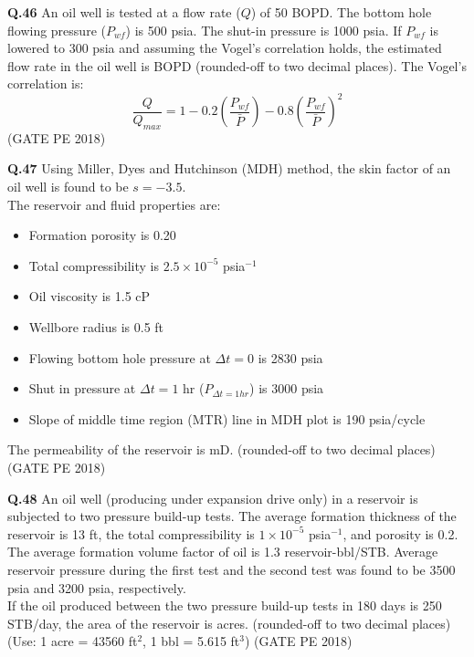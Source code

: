 \documentclass[15pt,a4paper]{article}
\begin{document}
\vspace{1cm}

\noindent\textbf{Q.46} An oil well is tested at a flow rate ($Q$) of 50 BOPD. The bottom hole flowing pressure ($P_{wf}$) is 500 psia. The shut-in pressure is 1000 psia. If $P_{wf}$ is lowered to 300 psia and assuming the Vogel's correlation holds, the estimated flow rate in the oil well is \underline{\hspace{2cm}} BOPD (rounded-off to two decimal places). The Vogel's correlation is:
\[ \frac{Q}{Q_{max}} = 1 - 0.2\left(\frac{P_{wf}}{\bar{P}}\right) - 0.8\left(\frac{P_{wf}}{\bar{P}}\right)^2 \] \hfill (GATE PE 2018)

\pagebreak

\noindent\textbf{Q.47} Using Miller, Dyes and Hutchinson (MDH) method, the skin factor of an oil well is found to be $s = -3.5$. \\ 

The reservoir and fluid properties are: 
\begin{itemize}
  \item Formation porosity is 0.20
  \item Total compressibility is $2.5 \times 10^{-5}$ psia$^{-1}$
  \item Oil viscosity is 1.5 cP
  \item Wellbore radius is 0.5 ft
  \item Flowing bottom hole pressure at $\Delta t = 0$ is 2830 psia
  \item Shut in pressure at $\Delta t = 1$ hr ($P_{\Delta t=1hr}$) is 3000 psia
  \item Slope of middle time region (MTR) line in MDH plot is 190 psia/cycle
\end{itemize}

The permeability of the reservoir is \underline{\hspace{2cm}} mD. (rounded-off to two decimal places) \hfill (GATE PE 2018)

\vspace{1cm}

\noindent\textbf{Q.48} An oil well (producing under expansion drive only) in a reservoir is subjected to two pressure build-up tests. The average formation thickness of the reservoir is 13 ft, the total compressibility is $1\times10^{-5}$ psia$^{-1}$, and porosity is 0.2. The average formation volume factor of oil is 1.3 reservoir-bbl/STB. Average reservoir pressure during the first test and the second test was found to be 3500 psia and 3200 psia, respectively. \\ 
If the oil produced between the two pressure build-up tests in 180 days is 250 STB/day, the area of the reservoir is \underline{\hspace{2cm}} acres. (rounded-off to two decimal places) \\ 
(Use: 1 acre = 43560 ft$^2$, 1 bbl = 5.615 ft$^3$) \hfill (GATE PE 2018)
\end{document}
